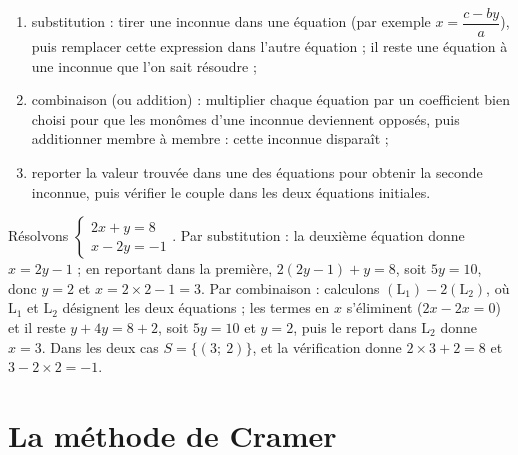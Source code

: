 \begin{methode}
\begin{enumerate}
  \item substitution : tirer une inconnue dans une équation (par exemple $x = \dfrac{c - by}{a}$), puis remplacer cette expression dans l'autre équation ; il reste une équation à une inconnue que l'on sait résoudre ;
  \item combinaison (ou addition) : multiplier chaque équation par un coefficient bien choisi pour que les monômes d'une inconnue deviennent opposés, puis additionner membre à membre : cette inconnue disparaît ;
  \item reporter la valeur trouvée dans une des équations pour obtenir la seconde inconnue, puis vérifier le couple dans les deux équations initiales.
\end{enumerate}
\end{methode}

\begin{exemple}
Résolvons $\begin{cases}2x + y = 8\\ x - 2y = -1\end{cases}$. Par substitution : la deuxième équation donne $x = 2y - 1$ ; en reportant dans la première, $2(2y - 1) + y = 8$, soit $5y = 10$, donc $y = 2$ et $x = 2 \times 2 - 1 = 3$. Par combinaison : calculons $(\text{L}_{1}) - 2(\text{L}_{2})$, où $\text{L}_{1}$ et $\text{L}_{2}$ désignent les deux équations ; les termes en $x$ s'éliminent ($2x - 2x = 0$) et il reste $y + 4y = 8 + 2$, soit $5y = 10$ et $y = 2$, puis le report dans $\text{L}_{2}$ donne $x = 3$. Dans les deux cas $S = \{(3;\ 2)\}$, et la vérification donne $2 \times 3 + 2 = 8$ et $3 - 2 \times 2 = -1$.
\end{exemple}

\section{La méthode de Cramer}

